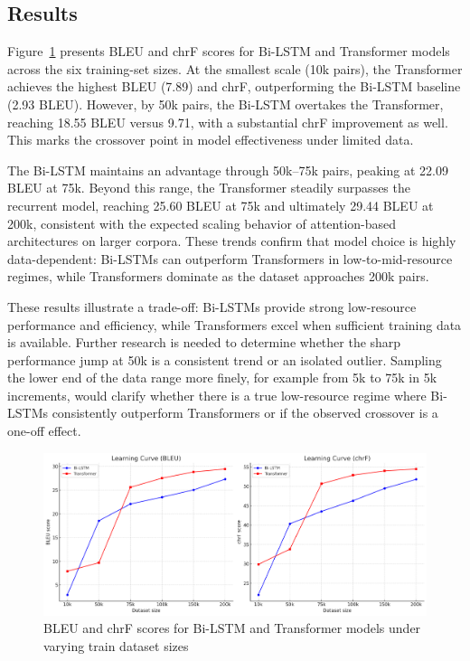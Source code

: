 \documentclass{article}
\begin{document}
\subsection{Results}
\label{subsec:results}
Figure~\ref{fig:crossover} presents BLEU and chrF scores for Bi-LSTM and Transformer models across the six training-set sizes. At the smallest scale (10k pairs), the Transformer achieves the highest BLEU (7.89) and chrF, outperforming the Bi-LSTM baseline (2.93 BLEU). However, by 50k pairs, the Bi-LSTM overtakes the Transformer, reaching 18.55 BLEU versus 9.71, with a substantial chrF improvement as well. This marks the crossover point in model effectiveness under limited data.

The Bi-LSTM maintains an advantage through 50k–75k pairs, peaking at 22.09 BLEU at 75k. Beyond this range, the Transformer steadily surpasses the recurrent model, reaching 25.60 BLEU at 75k and ultimately 29.44 BLEU at 200k, consistent with the expected scaling behavior of attention-based architectures on larger corpora. These trends confirm that model choice is highly data-dependent: Bi-LSTMs can outperform Transformers in low-to-mid-resource regimes, while Transformers dominate as the dataset approaches 200k pairs.

These results illustrate a trade-off: Bi-LSTMs provide strong low-resource performance and efficiency, while Transformers excel when sufficient training data is available. Further research is needed to determine whether the sharp performance jump at 50k is a consistent trend or an isolated outlier. Sampling the lower end of the data range more finely, for example from 5k to 75k in 5k increments, would clarify whether there is a true low-resource regime where Bi-LSTMs consistently outperform Transformers or if the observed crossover is a one-off effect.

\begin{figure}[ht]
\centering
\includegraphics[width=\linewidth]{crossover.png}
\caption{BLEU and chrF scores for Bi-LSTM and Transformer models under varying train dataset sizes}
\label{fig:crossover}
\end{figure}
\end{document}
